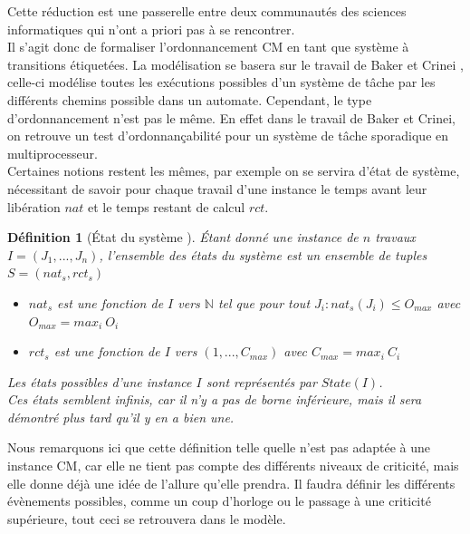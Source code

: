 \documentclass[11pt,a4paper,oneside]{book}
\theoremstyle{break}
\newtheorem{defin}{Définition}
\theoremstyle{breakplain}
\begin{document}
Cette réduction est une passerelle entre deux communautés des sciences informatiques qui n'ont a priori pas à se rencontrer.\\

Il s'agit donc de formaliser l'ordonnancement CM en tant que système à transitions étiquetées. La modélisation se basera sur le travail de Baker et Crinei \cite{bakerbrute}, celle-ci modélise toutes les exécutions possibles d'un système de tâche par les différents chemins possible dans un automate. Cependant, le type d'ordonnancement n'est pas le même. En effet dans le travail de Baker et Crinei, on retrouve un test d'ordonnançabilité pour un système de tâche sporadique en multiprocesseur.\\

Certaines notions restent les mêmes, par exemple on se servira d'état de système, nécessitant de savoir pour chaque travail d'une instance le temps avant leur libération $nat$ et le temps restant de calcul $rct$.

\begin{defin}[État du système \cite{geeraerts2013multiprocessor}]
Étant donné une instance de $n$ travaux $I = (J_1, ..., J_n)$, l'ensemble des états du système est un ensemble de tuples $S = (nat_s, rct_s)$
\begin{itemize}
\item $nat_s$ est une fonction de $I$ vers $\mathbb{N}$ tel que pour tout $J_i : nat_s(J_i) \leq O_{max}$ avec $O_{max} = max_i\ O_i$
\item $rct_s$ est une fonction de $I$ vers $(1,...,C_{max})$ avec $C_{max} = max_i\ C_i$
\end{itemize}

Les états possibles d'une instance $I$ sont représentés par $State(I)$.\\
Ces états semblent infinis, car il n'y a pas de borne inférieure, mais il sera démontré plus tard qu'il y en a bien une.
\end{defin}

Nous remarquons ici que cette définition telle quelle n'est pas adaptée à une instance CM, car elle ne tient pas compte des différents niveaux de criticité, mais elle donne déjà une idée de l'allure qu'elle prendra. Il faudra définir les différents évènements possibles, comme un coup d'horloge ou le passage à une criticité supérieure, tout ceci se retrouvera dans le modèle.
\end{document}
